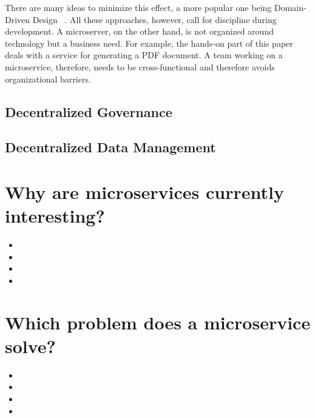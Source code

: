 There are many ideas to minimize this effect, a more popular one being Domain-Driven Design ~\cite{evans.2003}. All these approaches, however, call for discipline during development. A microserver, on the other hand, is not organized around technology but a business need. For example, the hands-on part of this paper deals with a service for generating a PDF document. A team working on a microservice, therefore, needs to be cross-functional and therefore avoids organizational barriers.


\subsection{Decentralized Governance}

\subsection{Decentralized Data Management}



\section{Why are microservices currently interesting?}

\begin{itemize}
  \item {}
  \item {}
  \item {}
  \item {}
\end{itemize}


\section{Which problem does a microservice solve?}
\label{sec:theory:what-problem}

\begin{itemize}
  \item {}
  \item {}
  \item {}
  \item {}
\end{itemize}


